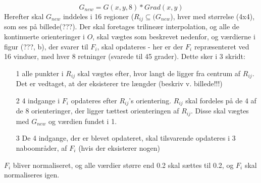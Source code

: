 \begin{equation}
G_{new} = G(x,y,8) * Grad(x,y)
\end{equation}
Herefter skal $G_{new}$ inddeles i 16 regioner ($R_{ij} \subseteq (G_{new}$), hver med størrelse (4x4), som ses på billede(???). Der skal foretages trilineær interpolation, og alle de kontinuerte orienteringer i $O$, skal vægtes som beskrevet nedenfor, og værdierne i figur (???, b), der svarer til $F_i$, skal opdateres - her er der $F_i$ repræsenteret ved 16 vinduer, med hver 8 retninger (svarede til 45 grader). Dette sker i 3 skridt:
\begin{itemize}
\item[1] alle punkter i $R_{ij}$ skal vægtes efter, hvor langt de ligger fra centrum af $R_{ij}$. Det er vedtaget, at der eksisterer tre længder (beskriv v. billede!!!)
\item[2] 4 indgange i $F_i$ opdateres efter $R_{ij}$'s orientering. $R_{ij}$ skal fordeles på de 4 af de 8 orienteringer, der ligger tættest orienteringen af $R_{ij}$. Disse skal vægtes med $G_{new}$ og værdien fundet i 1. 
\item[3] De 4 indgange, der er blevet opdateret, skal tilsvarende opdateres i 3 naboområder, af $F_i$ (hvis der eksisterer nogen)
\end{itemize}

$F_i$ bliver normaliseret, og alle værdier større end 0.2 skal sættes til 0.2, og $F_i$ skal normaliseres igen.